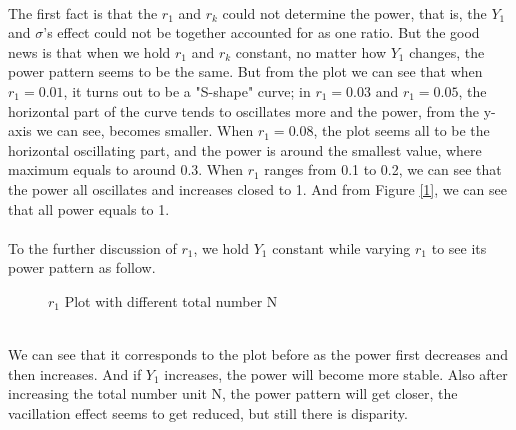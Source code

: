 \documentclass[10pt,english]{article}\usepackage{graphicx, color}
\numberwithin{equation}{section}
\numberwithin{figure}{section}
\begin{document}
\quad\\
The first fact is that the  $r_1$ and $r_k$ could not determine the power, that is, the $Y_1$ and $\sigma$'s effect could not be together accounted for as one ratio. But the good news is that when we hold $r_1$ and $r_k$ constant, no matter how $Y_1$ changes, the power pattern seems to be the same. But from the plot we can see that when $r_1=0.01$, it turns out to be a "S-shape" curve; in $r_1=0.03$ and $r_1=0.05$, the horizontal part of the curve tends to oscillates more and the power, from the y-axis we can see, becomes smaller. When $r_1=0.08$, the plot seems all to be the horizontal oscillating part, and the power is around the smallest value, where maximum equals to around 0.3. When $r_1$ ranges from 0.1 to 0.2, we can see that the power all oscillates and increases closed to 1. And from Figure \ref{1}, we can see that all power equals to 1.\\
\quad\\
To the further discussion of $r_1$, we hold $Y_1$ constant while varying $r_1$ to see its power pattern as follow.\\
\begin{figure}[htbp]
\centering{}
\caption{$r_1$ Plot with different total number N}
\end{figure}
\quad\\
We can see that it corresponds to the plot before as the power first decreases and then increases. And if $Y_1$ increases, the power will become more stable. Also after increasing the total number unit N, the power pattern will get closer, the vacillation effect seems to get reduced, but still there is disparity. \\
\end{document}
